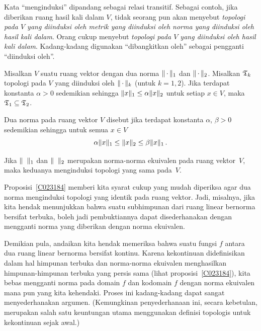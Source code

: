 Kata ``menginduksi'' dipandang sebagai relasi transitif. Sebagai contoh, jika diberikan
ruang hasil kali dalam $V$, tidak seorang pun akan menyebut \emph{topologi pada $V$ yang
diinduksi oleh metrik yang diinduksi oleh norma yang diinduksi oleh hasil kali dalam}.
Orang cukup menyebut \emph{topologi pada $V$ yang diinduksi oleh hasil kali dalam}.
Kadang-kadang digunakan ``dibangkitkan oleh'' sebagai pengganti ``diinduksi oleh''.

\begin{prop} Misalkan $V$ suatu ruang vektor dengan dua norma $\lVert\,\cdot\,\rVert_1$ dan
$\lVert\,\cdot\,\rVert_2$. Misalkan $\mathfrak{T}_k$ topologi pada $V$ yang diinduksi oleh
$\lVert\,\cdot\,\rVert_k$ (untuk $k = 1,2$). Jika terdapat konstanta $\alpha > 0$ sedemikian
sehingga $\lVert x\rVert_1 \le \alpha \lVert x\rVert_2$ untuk setiap $x \in V$, maka
$\mathfrak{T}_1 \subseteq \mathfrak{T}_2$.
\end{prop}

\begin{defn} Dua norma pada ruang vektor $V$ disebut
 jika terdapat konstanta $\alpha$, $\beta > 0$ sedemikian sehingga untuk
semua $x \in V$
   \[ \alpha\lVert x\rVert_1 \le \lVert x\rVert_2 \le \beta \lVert x\rVert_1\,. \]
\end{defn}

\begin{prop}\label{C023184} Jika $\lVert\hphantom{x}\rVert_1$ dan
$\lVert\hphantom{x}\rVert_2$
merupakan norma-norma ekuivalen pada ruang vektor~$V$, maka keduanya menginduksi topologi
yang sama pada~$V$.
\end{prop}

Proposisi~\ref{C023184} memberi kita syarat cukup yang mudah diperiksa agar dua norma
menginduksi topologi yang identik pada ruang vektor. Jadi, misalnya, jika kita hendak
menunjukkan bahwa suatu subhimpunan dari ruang linear bernorma bersifat terbuka, boleh jadi
pembuktiannya dapat disederhanakan dengan mengganti norma yang diberikan dengan norma
ekuivalen.

Demikian pula, andaikan kita hendak memeriksa bahwa suatu fungsi $f$ antara dua ruang
linear bernorma bersifat kontinu. Karena kekontinuan didefinisikan dalam hal himpunan
terbuka dan norma-norma ekuivalen menghasilkan himpunan-himpunan terbuka yang persis sama
(lihat proposisi~\ref{C023184}), kita bebas mengganti norma pada domain $f$ dan kodomain
$f$ dengan norma ekuivalen mana pun yang kita kehendaki. Proses ini kadang-kadang dapat
sangat menyederhanakan argumen. (Kemungkinan penyederhanaan ini, secara kebetulan,
merupakan salah satu keuntungan utama menggunakan definisi topologis untuk kekontinuan
sejak awal.)


